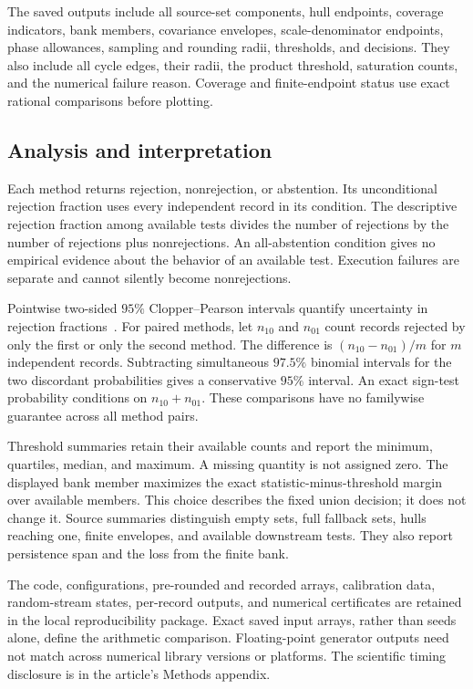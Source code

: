 The saved outputs include all source-set components, hull endpoints, coverage indicators, bank members, covariance envelopes, scale-denominator endpoints, phase allowances, sampling and rounding radii, thresholds, and decisions. They also include all cycle edges, their radii, the product threshold, saturation counts, and the numerical failure reason. Coverage and finite-endpoint status use exact rational comparisons before plotting.

\subsection{Analysis and interpretation}
Each method returns rejection, nonrejection, or abstention. Its unconditional rejection fraction uses every independent record in its condition. The descriptive rejection fraction among available tests divides the number of rejections by the number of rejections plus nonrejections. An all-abstention condition gives no empirical evidence about the behavior of an available test. Execution failures are separate and cannot silently become nonrejections.

Pointwise two-sided $95\%$ Clopper--Pearson intervals quantify uncertainty in rejection fractions~\cite{clopper}. For paired methods, let $n_{10}$ and $n_{01}$ count records rejected by only the first or only the second method. The difference is $(n_{10}-n_{01})/m$ for $m$ independent records. Subtracting simultaneous $97.5\%$ binomial intervals for the two discordant probabilities gives a conservative $95\%$ interval. An exact sign-test probability conditions on $n_{10}+n_{01}$. These comparisons have no familywise guarantee across all method pairs.

Threshold summaries retain their available counts and report the minimum, quartiles, median, and maximum. A missing quantity is not assigned zero. The displayed bank member maximizes the exact statistic-minus-threshold margin over available members. This choice describes the fixed union decision; it does not change it. Source summaries distinguish empty sets, full fallback sets, hulls reaching one, finite envelopes, and available downstream tests. They also report persistence span and the loss from the finite bank.

The code, configurations, pre-rounded and recorded arrays, calibration data, random-stream states, per-record outputs, and numerical certificates are retained in the local reproducibility package. Exact saved input arrays, rather than seeds alone, define the arithmetic comparison. Floating-point generator outputs need not match across numerical library versions or platforms. The scientific timing disclosure is in the article's Methods appendix.
